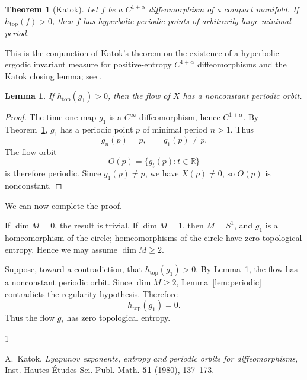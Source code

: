 \documentclass[11pt]{article}
\newtheorem{lemma}{Lemma}
\newtheorem{theorem}{Theorem}
\theoremstyle{remark}
\begin{document}
\begin{theorem}[Katok]\label{thm:katok}
Let \(f\) be a \(C^{1+\alpha}\) diffeomorphism of a compact manifold. If
\(h_{\mathrm{top}}(f)>0\), then \(f\) has hyperbolic periodic points of arbitrarily large minimal period.
\end{theorem}

This is the conjunction of Katok's theorem on the existence of a hyperbolic ergodic invariant measure for positive-entropy \(C^{1+\alpha}\) diffeomorphisms and the Katok closing lemma; see \cite{Katok80}.

\begin{lemma}\label{lem:katok-flow}
If \(h_{\mathrm{top}}(g_1)>0\), then the flow of \(X\) has a nonconstant periodic orbit.
\end{lemma}

\begin{proof}
The time-one map \(g_1\) is a \(C^\infty\) diffeomorphism, hence \(C^{1+\alpha}\). By Theorem~\ref{thm:katok}, \(g_1\) has a periodic point \(p\) of minimal period \(n>1\). Thus
\[
g_n(p)=p,\qquad g_1(p)\neq p.
\]
The flow orbit
\[
O(p)=\{g_t(p):t\in\mathbb R\}
\]
is therefore periodic. Since \(g_1(p)\neq p\), we have \(X(p)\neq 0\), so \(O(p)\) is nonconstant.
\end{proof}

We can now complete the proof.

If \(\dim M=0\), the result is trivial. If \(\dim M=1\), then \(M=S^1\), and \(g_1\) is a homeomorphism of the circle; homeomorphisms of the circle have zero topological entropy. Hence we may assume \(\dim M\ge 2\).

Suppose, toward a contradiction, that \(h_{\mathrm{top}}(g_1)>0\). By Lemma~\ref{lem:katok-flow}, the flow has a nonconstant periodic orbit. Since \(\dim M\ge2\), Lemma~\ref{lem:periodic} contradicts the regularity hypothesis. Therefore
\[
h_{\mathrm{top}}(g_1)=0.
\]
Thus the flow \(g_t\) has zero topological entropy.

\begin{thebibliography}{1}

A.~Katok,
\textit{Lyapunov exponents, entropy and periodic orbits for diffeomorphisms},
Inst. Hautes \'Etudes Sci. Publ. Math. \textbf{51} (1980), 137--173.

\end{thebibliography}
\end{document}
